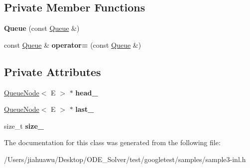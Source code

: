 \subsection*{Private Member Functions}
\begin{DoxyCompactItemize}
\item 
\mbox{\label{class_queue_ac071ee553005a67737d35edeeaafca5b}} 
{\bfseries Queue} (const \mbox{\hyperlink{class_queue}{Queue}} \&)
\item 
\mbox{\label{class_queue_adf6f3eb046365f1b67b6c0bd5da2da59}} 
const \mbox{\hyperlink{class_queue}{Queue}} \& {\bfseries operator=} (const \mbox{\hyperlink{class_queue}{Queue}} \&)
\end{DoxyCompactItemize}
\subsection*{Private Attributes}
\begin{DoxyCompactItemize}
\item 
\mbox{\label{class_queue_abf9219bcea800d26e8bfdb4777d98729}} 
\mbox{\hyperlink{class_queue_node}{Queue\+Node}}$<$ E $>$ $\ast$ {\bfseries head\+\_\+}
\item 
\mbox{\label{class_queue_a7466dca4f96147c9124af582ab170df0}} 
\mbox{\hyperlink{class_queue_node}{Queue\+Node}}$<$ E $>$ $\ast$ {\bfseries last\+\_\+}
\item 
\mbox{\label{class_queue_a7ac3c0717d894e1aecc56f4ddb35c7ea}} 
size\+\_\+t {\bfseries size\+\_\+}
\end{DoxyCompactItemize}


The documentation for this class was generated from the following file\+:\begin{DoxyCompactItemize}
\item 
/\+Users/jiahuawu/\+Desktop/\+O\+D\+E\+\_\+\+Solver/test/googletest/samples/sample3-\/inl.\+h\end{DoxyCompactItemize}
